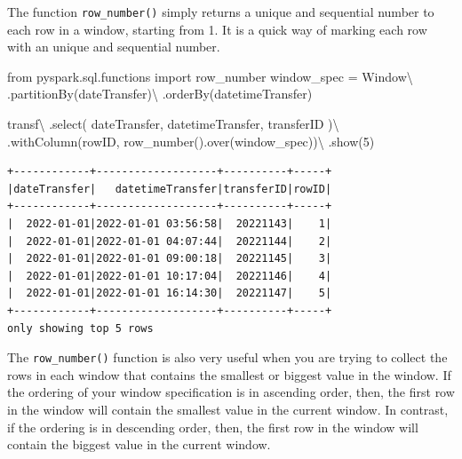 \documentclass[
  11pt,
  letterpaper,
  DIV=11,
  numbers=noendperiod]{scrreprt}
\newenvironment{Shaded}{\begin{snugshade}}{\end{snugshade}}
\newcommand{\DecValTok}[1]{\textcolor[rgb]{0.68,0.00,0.00}{#1}}
\newcommand{\ImportTok}[1]{\textcolor[rgb]{0.00,0.46,0.62}{#1}}
\newcommand{\NormalTok}[1]{\textcolor[rgb]{0.00,0.23,0.31}{#1}}
\newcommand{\OperatorTok}[1]{\textcolor[rgb]{0.37,0.37,0.37}{#1}}
\newcommand{\StringTok}[1]{\textcolor[rgb]{0.13,0.47,0.30}{#1}}
\begin{document}
The function \texttt{row\_number()} simply returns a unique and
sequential number to each row in a window, starting from 1. It is a
quick way of marking each row with an unique and sequential number.

\begin{Shaded}
\begin{Highlighting}[]
\ImportTok{from}\NormalTok{ pyspark.sql.functions }\ImportTok{import}\NormalTok{ row\_number}
\NormalTok{window\_spec }\OperatorTok{=}\NormalTok{ Window}\OperatorTok{\textbackslash{}}
\NormalTok{    .partitionBy(}\StringTok{\textquotesingle{}dateTransfer\textquotesingle{}}\NormalTok{)}\OperatorTok{\textbackslash{}}
\NormalTok{    .orderBy(}\StringTok{\textquotesingle{}datetimeTransfer\textquotesingle{}}\NormalTok{)}

\NormalTok{transf}\OperatorTok{\textbackslash{}}
\NormalTok{    .select(}
        \StringTok{\textquotesingle{}dateTransfer\textquotesingle{}}\NormalTok{,}
        \StringTok{\textquotesingle{}datetimeTransfer\textquotesingle{}}\NormalTok{,}
        \StringTok{\textquotesingle{}transferID\textquotesingle{}}
\NormalTok{    )}\OperatorTok{\textbackslash{}}
\NormalTok{    .withColumn(}\StringTok{\textquotesingle{}rowID\textquotesingle{}}\NormalTok{, row\_number().over(window\_spec))}\OperatorTok{\textbackslash{}}
\NormalTok{    .show(}\DecValTok{5}\NormalTok{)}
\end{Highlighting}
\end{Shaded}

\begin{verbatim}
+------------+-------------------+----------+-----+
|dateTransfer|   datetimeTransfer|transferID|rowID|
+------------+-------------------+----------+-----+
|  2022-01-01|2022-01-01 03:56:58|  20221143|    1|
|  2022-01-01|2022-01-01 04:07:44|  20221144|    2|
|  2022-01-01|2022-01-01 09:00:18|  20221145|    3|
|  2022-01-01|2022-01-01 10:17:04|  20221146|    4|
|  2022-01-01|2022-01-01 16:14:30|  20221147|    5|
+------------+-------------------+----------+-----+
only showing top 5 rows
\end{verbatim}

The \texttt{row\_number()} function is also very useful when you are
trying to collect the rows in each window that contains the smallest or
biggest value in the window. If the ordering of your window
specification is in ascending order, then, the first row in the window
will contain the smallest value in the current window. In contrast, if
the ordering is in descending order, then, the first row in the window
will contain the biggest value in the current window.
\end{document}
